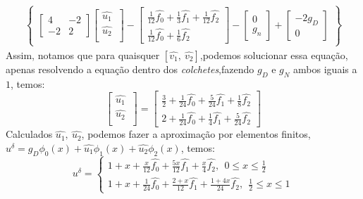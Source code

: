 \begin{align}
[\hat{v_1}\ \hat{v_2}]\begin{Bmatrix}
\begin{bmatrix}
4 & -2 \\ 
-2 & 2
\end{bmatrix}
\begin{bmatrix}
\hat{u_1}\ \\ \hat{u_2}\\ 
\end{bmatrix}
-
\begin{bmatrix}
\frac{1}{12}\hat{f_0} + \frac{1}{3}\hat{f_1} + \frac{1}{12}\hat{f_2} \\ 
\frac{1}{12}\hat{f_0} + \frac{1}{6}\hat{f_2}
\end{bmatrix}-
\begin{bmatrix}
0\\ 
g_n
\end{bmatrix}+
\begin{bmatrix}
-2g_D\\ 
0
\end{bmatrix}
\end{Bmatrix}
\end{align}
 Assim, notamos que para quaisquer $[\hat{v_1},\ \hat{v_2}]$,podemos solucionar essa equação, apenas resolvendo a equação dentro dos \emph{colchetes},fazendo $g_D$ e $g_N$ ambos iguais a $1$, temos:
\begin{equation}
 \begin{bmatrix}
\hat{u_1}\ \\ \hat{u_2}\\ 
\end{bmatrix}
= \begin{bmatrix}\frac{3}{2} +\frac{1}{24}\hat{f_0}+\frac{5}{24}\hat{f_1}+\frac{1}{8}\hat{f_2} \\ 2 +\frac{1}{24}\hat{f_0}+\frac{1}{4}\hat{f_1}+\frac{5}{24}\hat{f_2} \end{bmatrix}
\end{equation}
 Calculados $\hat{u_1},\ \hat{u_2}$, podemos fazer a aproximação por elementos finitos, $u^\delta =g_D\phi_0(x) + \hat{u_1}\phi_1(x) +\hat{u_2}\phi_2(x)$, temos:
\begin{equation}
u^\delta =
\begin{cases}
1 + x +\frac{x}{12}\hat{f_0} + \frac{5x}{12}\hat{f_1} +\frac{x} {4}\hat{f_2},\ \ 0 \leq x \leq \frac{1}{2}\\
1 + x +\frac{1}{24}\hat{f_0} + \frac{2+x}{12}\hat{f_1} +\frac{1+4x}{24}\hat{f_2},\ \ \frac{1}{2} \leq x \leq 1
\end{cases}
\end{equation}




